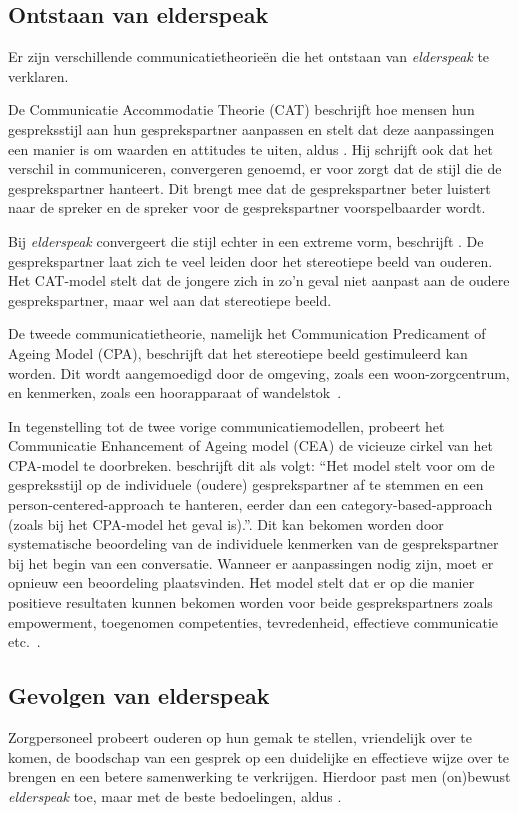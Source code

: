 \subsection{Ontstaan van elderspeak}
Er zijn verschillende communicatietheorieën die het ontstaan van \textit{elderspeak} te verklaren.

De Communicatie Accommodatie Theorie (CAT) beschrijft hoe mensen hun gespreksstijl aan hun gesprekspartner aanpassen en stelt dat deze aanpassingen een manier is om waarden en attitudes te uiten, aldus \textcite{Campens2021}. Hij schrijft ook dat het verschil in communiceren, convergeren genoemd, er voor zorgt dat de stijl die de gesprekspartner hanteert. Dit brengt mee dat de gesprekspartner beter luistert naar de spreker en de spreker voor de gesprekspartner voorspelbaarder wordt.

Bij \textit{elderspeak} convergeert die stijl echter in een extreme vorm, beschrijft \textcite{Campens2021}. De gesprekspartner laat zich te veel leiden door het stereotiepe beeld van ouderen. Het CAT-model stelt dat de jongere zich in zo’n geval niet aanpast aan de oudere gesprekspartner, maar wel aan dat stereotiepe beeld.

De tweede communicatietheorie, namelijk het Communication Predicament of Ageing Model (CPA), beschrijft dat het stereotiepe beeld gestimuleerd kan worden. Dit wordt aangemoedigd door de omgeving, zoals een woon-zorgcentrum, en kenmerken, zoals een hoorapparaat of wandelstok~\autocite{Campens2021}.

In tegenstelling tot de twee vorige communicatiemodellen, probeert het Communicatie Enhancement of Ageing model (CEA) de vicieuze cirkel van het CPA-model te doorbreken. \textcite{Campens2021} beschrijft dit als volgt: ``Het model stelt voor om de gespreksstijl op de individuele (oudere) gesprekspartner af te stemmen en een person-centered-approach te hanteren, eerder dan een category-based-approach (zoals bij het CPA-model het geval is).''. Dit kan bekomen worden door systematische beoordeling van de individuele kenmerken van de gesprekspartner bij het begin van een conversatie. Wanneer er aanpassingen nodig zijn, moet er opnieuw een beoordeling plaatsvinden. Het model stelt dat er op die manier positieve resultaten kunnen bekomen worden voor beide gesprekspartners zoals empowerment, toegenomen competenties, tevredenheid, effectieve communicatie etc.~\autocite{Campens2021}.

\subsection{Gevolgen van elderspeak}
Zorgpersoneel probeert ouderen op hun gemak te stellen, vriendelijk over te komen, de boodschap van een gesprek op een duidelijke en effectieve wijze over te brengen en een betere samenwerking te verkrijgen. Hierdoor past men (on)bewust \textit{elderspeak} toe, maar met de beste bedoelingen, aldus \textcite{Campens2021}.

